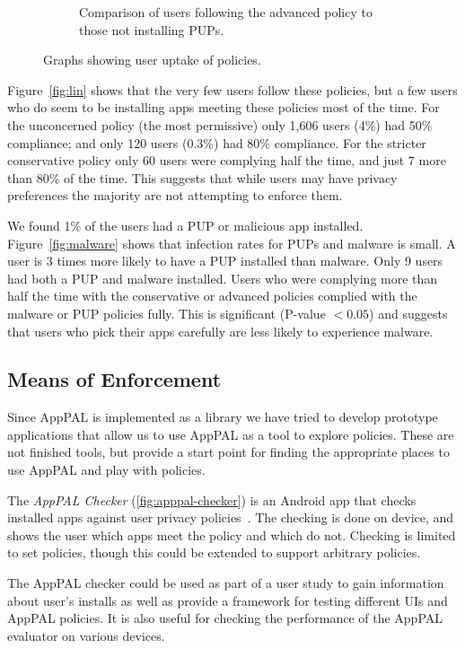 \documentclass{scrartcl}
\begin{document}
\begin{figure}
\begin{subfigure}[b]{0.45\linewidth}
    \caption{Comparison of users following the advanced policy to those not installing PUPs.}
    \label{fig:advancedvspup}
  \end{subfigure}
  \caption{Graphs showing user uptake of policies.}
\end{figure}

Figure~\ref{fig:lin} shows that the very few users follow these policies, but a few users who do seem to be installing apps meeting these policies most of the time.
For the unconcerned policy (the most permissive) only 1,606 users (4\%) had 50\% compliance;
and only 120 users (0.3\%) had 80\% compliance.
For the stricter conservative policy only 60 users were complying half the time, and just 7 more than 80\% of the time.
This suggests that while users may have privacy preferences the majority are not attempting to enforce them.

We found 1\% of the users had a PUP or malicious app installed.
Figure~\ref{fig:malware} shows that infection rates for PUPs and malware is small.
A user is 3 times more likely to have a PUP installed than malware.
Only 9 users had both a PUP and malware installed.
Users who were complying more than half the time with the conservative or advanced policies complied with the malware or PUP policies fully.
This is significant (P-value $< 0.05$) and suggests that users who pick their apps carefully are less likely to experience malware.


\subsection{Means of Enforcement}

Since AppPAL is implemented as a library we have tried to develop prototype applications that allow us to use AppPAL as a tool to explore policies.
These are not finished tools, but provide a start point for finding the appropriate places to use AppPAL and play with policies.

The \emph{AppPAL Checker} (\autoref{fig:apppal-checker}) is an Android app that checks installed apps against user privacy policies~\citep{Sadeh:2014vq}.
The checking is done on device, and shows the user which apps meet the policy and which do not.
Checking is limited to set policies, though this could be extended to support arbitrary policies.

The AppPAL checker could be used as part of a user study to gain information about user's installs as well as provide a framework for testing different UIs and AppPAL policies.
It is also useful for checking the performance of the AppPAL evaluator on various devices.
\end{document}
